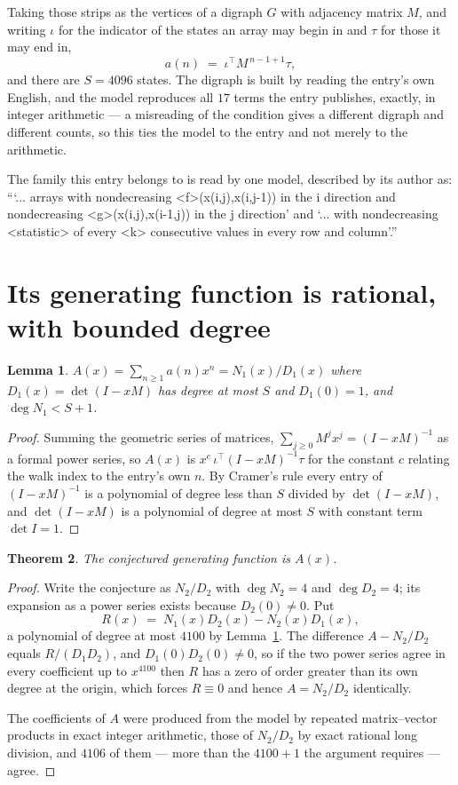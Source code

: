 \documentclass[11pt,a4paper]{article}
\theoremstyle{plain}
\newtheorem{theorem}{Theorem}
\newtheorem{lemma}[theorem]{Lemma}
\theoremstyle{definition}
\begin{document}
Taking those strips as the vertices of a digraph $G$ with adjacency matrix $M$, and writing
$\iota$ for the indicator of the states an array may begin in and $\tau$ for those it may end
in,
\[
a(n)\;=\;\iota^{\!\top}M^{\,n-1+1}\tau ,
\]
and there are $S=4096$ states. The digraph is built by reading the entry's own English, and the
model reproduces all $17$ terms the entry publishes, exactly, in integer arithmetic --- a
misreading of the condition gives a different digraph and different counts, so this ties the
model to the entry and not merely to the arithmetic.

The family this entry belongs to is read by one model, described by its author as: ```... arrays with nondecreasing <f>(x(i,j),x(i,j-1)) in the i direction and nondecreasing <g>(x(i,j),x(i-1,j)) in the j direction' and `... with nondecreasing <statistic> of every <k> consecutive values in every row and column'.''


\section{Its generating function is rational, with bounded degree}

\begin{lemma}\label{lem:rat}
$A(x)=\sum_{n\ge1}a(n)x^n=N_1(x)/D_1(x)$ where $D_1(x)=\det(I-xM)$ has degree at most
$S$ and $D_1(0)=1$, and $\deg N_1<S+1$.
\end{lemma}

\begin{proof}
Summing the geometric series of matrices, $\sum_{j\ge0}M^jx^j=(I-xM)^{-1}$ as a formal
power series, so $A(x)$ is $x^{c}\,\iota^{\!\top}(I-xM)^{-1}\tau$ for the constant $c$
relating the walk index to the entry's own $n$. By Cramer's rule every entry of
$(I-xM)^{-1}$ is a polynomial of degree less than $S$ divided by $\det(I-xM)$, and
$\det(I-xM)$ is a polynomial of degree at most $S$ with constant term $\det I=1$.
\end{proof}

\begin{theorem}
The conjectured generating function is $A(x)$.
\end{theorem}

\begin{proof}
Write the conjecture as $N_2/D_2$ with $\deg N_2=4$ and $\deg D_2=4$; its expansion as a
power series exists because $D_2(0)\neq0$. Put
\[
R(x)\;=\;N_1(x)D_2(x)-N_2(x)D_1(x),
\]
a polynomial of degree at most $4100$ by Lemma~\ref{lem:rat}. The difference
$A-N_2/D_2$ equals $R/(D_1D_2)$, and $D_1(0)D_2(0)\neq0$, so if the two power series agree in
every coefficient up to $x^{4100}$ then $R$ has a zero of order greater than its own
degree at the origin, which forces $R\equiv0$ and hence $A=N_2/D_2$ identically.

The coefficients of $A$ were produced from the model by repeated matrix--vector products in
exact integer arithmetic, those of $N_2/D_2$ by exact rational long division, and $4106$
of them --- more than the $4100+1$ the argument requires --- agree.
\end{proof}
\end{document}
